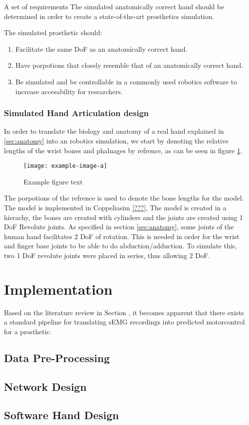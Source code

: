 \documentclass[../main.tex]{subfiles}
\begin{document}
A set of requirements The simulated anatomically correct hand should be determined in order to create a state-of-the-art prosthetics simulation.

The simulated prosthetic should:

\begin{enumerate}
\item Facilitate the same DoF as an anatomically correct hand.
\item Have porpotions that closely resemble that of an anatomically correct hand.
\item Be simulated and be controllable in a commonly used robotics software to increase accesability for researchers.
\end{enumerate}

\subsubsection{Simulated Hand Articulation design}

In order to translate the biology and anatomy of a real hand explained in \ref{sec:anatomy} into an robotics simulation, we start by denoting the relative lengths of the wrist bones and phalnages by refrence, as can be seen in figure \ref{fig:handref}.

\begin{figure}[h]
\begin{center}
\texttt{[image: example-image-a]}
\caption{Example figure text}
\label{fig:handref}
\end{center}
\end{figure}

The porpotions of the refrence is used to denote the bone lengths for the model.
The model is implemented in Coppeliasim \ref{???}, The model is created in a hierachy, the bones are created with cylinders and the joints are created using 1 DoF Revolute joints.
As specified in section \ref{sec:anatomy}, some joints of the human hand facilitates 2 DoF of rotation.
This is needed in order for the wrist and finger base joints to be able to do \gls{abduction/adduction}.
To simulate this, two 1 DoF revolute joints were placed in series, thus allowing 2 DoF.



\section{Implementation}

Based on the literature review in Section \label{sec:literature}, it becomes apparent that there exists a standard pipeline for translating sEMG recordings into predicted motorcontrol for a prosthetic.

\subsection{Data Pre-Processing}
\subsection{Network Design}
\subsection{Software Hand Design}
\end{document}
